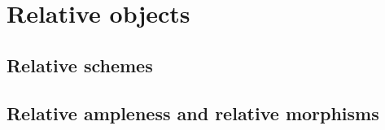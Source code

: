 \section{Relative objects}

\subsection{Relative schemes}

\subsection{Relative ampleness and relative morphisms}


